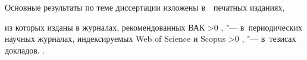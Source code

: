 {\begin{refsection}
        \nocite{vakbib1}%
        \nocite{vakbib2}%
        \nocite{scbib1}%
        \nocite{scbib2}%
        \nocite{confbib1}%
        \nocite{confbib2}%
        \nocite{confbib3}%
        \nocite{bib1}%
        {\publications} Основные результаты по теме диссертации изложены в~~печатных изданиях,
        \setcounter{citeauthorscwostot}{\value{citeauthorscopus}}%
        \addtocounter{citeauthorscwostot}{\value{citeauthorwos}}%
         из которых изданы в журналах, рекомендованных ВАК\sloppy%
        \ifnum \value{citeauthorscwostot}>0%
            ,  "--- в~периодических научных журналах, индексируемых Web of Science и Scopus\sloppy%
        \fi%
        \ifnum \value{citeauthorconf}>0%
            ,  "--- в~тезисах докладов.
        \else%
            .
        \fi
    \end{refsection}%
    \begin{refsection}
        \nocite{vakbib2}%
        \nocite{bib1}%
        \nocite{confbib1}%
    \end{refsection}%
	
}

